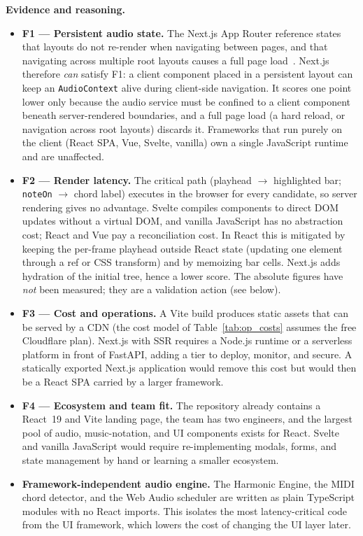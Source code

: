 \documentclass[a4paper]{article}
\begin{document}
\textbf{Evidence and reasoning.}
\begin{itemize}
    \item \textbf{F1 --- Persistent audio state.} The Next.js App Router reference states that layouts do not re-render when navigating between pages, and that navigating across multiple root layouts causes a full page load~\cite{nextjs_layouts}. Next.js therefore \emph{can} satisfy F1: a client component placed in a persistent layout can keep an \texttt{AudioContext} alive during client-side navigation. It scores one point lower only because the audio service must be confined to a client component beneath server-rendered boundaries, and a full page load (a hard reload, or navigation across root layouts) discards it. Frameworks that run purely on the client (React SPA, Vue, Svelte, vanilla) own a single JavaScript runtime and are unaffected.
    \item \textbf{F2 --- Render latency.} The critical path (playhead $\to$ highlighted bar; \texttt{noteOn} $\to$ chord label) executes in the browser for every candidate, so server rendering gives no advantage. Svelte compiles components to direct DOM updates without a virtual DOM, and vanilla JavaScript has no abstraction cost; React and Vue pay a reconciliation cost. In React this is mitigated by keeping the per-frame playhead outside React state (updating one element through a ref or CSS transform) and by memoizing bar cells. Next.js adds hydration of the initial tree, hence a lower score. The absolute figures have \emph{not} been measured; they are a validation action (see below).
    \item \textbf{F3 --- Cost and operations.} A Vite build produces static assets that can be served by a CDN (the cost model of Table~\ref{tab:op_costs} assumes the free Cloudflare plan). Next.js with SSR requires a Node.js runtime or a serverless platform in front of FastAPI, adding a tier to deploy, monitor, and secure. A statically exported Next.js application would remove this cost but would then be a React SPA carried by a larger framework.
    \item \textbf{F4 --- Ecosystem and team fit.} The repository already contains a React~19 and Vite landing page, the team has two engineers, and the largest pool of audio, music-notation, and UI components exists for React. Svelte and vanilla JavaScript would require re-implementing modals, forms, and state management by hand or learning a smaller ecosystem.
    \item \textbf{Framework-independent audio engine.} The Harmonic Engine, the MIDI chord detector, and the Web Audio scheduler are written as plain TypeScript modules with no React imports. This isolates the most latency-critical code from the UI framework, which lowers the cost of changing the UI layer later.
\end{itemize}
\end{document}
